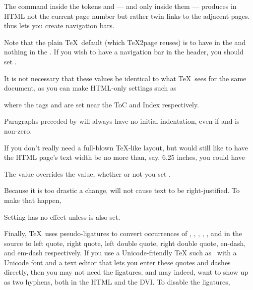 The command \p{\folio} inside the tokens \p{\headline} and \p{\footline}
— and only inside them —
produces in HTML not the current page number but rather twin links to the
adjacent pages. \p{\folio} thus lets you create navigation
bars.

Note that the plain \TeX\ default (which
\TeX2page reuses) is to have \p{\folio} in the
\p{\footline} and nothing in the \p{\headline}.  If you wish
to have a navigation bar in the header, you should set
\p{\headline}.

It is not necessary that these values be
identical to what \TeX\ sees for the same document, as you can
make HTML-only settings such as

%

\n where the tags  and  are set near
the ToC and Index respectively.

%
Paragraphs preceded by \p{\noindent} will always have no initial
indentation, even if  and \p{\parskip} is
non-zero.

%
If you don’t really need a full-blown \TeX-like layout, but would
still like to have the HTML page’s text width be no more than,
say, 6.25 inches, you could have

\p{
\def\TZPhsize{6.25 in}
}
The \p{\TZPhsize} value overrides the \p{\hsize} value, whether
or not you set \p{\TZPtexlayout}.

Because it is too drastic a change,  will not cause
text to be right-justified.  To make that happen,


\n Setting \p{\TZPraggedright} has no effect unless \p{\TZPtexlayout} is
also set.

Finally, \TeX\ uses pseudo-ligatures to convert occurrences of , , , , \p{--}, and \p{---}
in the source to left quote, right quote, left double quote, right double quote, en-dash, and em-dash respectively.
If you use a Unicode-friendly TeX such as \XeTeX\ with a Unicode font and a text editor that lets you enter these quotes and dashes directly, then you may
not need the ligatures, and may indeed, want \p{--} to show up as two hyphens, both in the HTML and the DVI.  To disable the ligatures,

